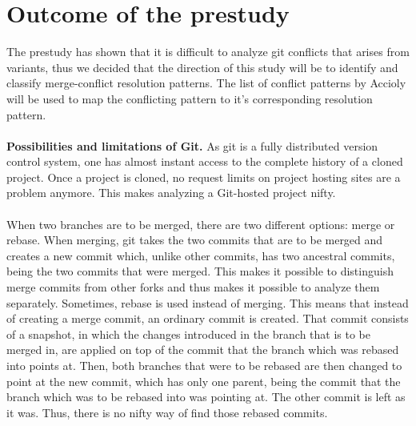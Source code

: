 \section{Outcome of the prestudy}
The prestudy has shown that it is difficult to analyze git conflicts that arises from variants, thus we decided that the direction of this study will be to identify and classify merge-conflict resolution patterns. The list of conflict patterns by Accioly will be used to map the conflicting pattern to it’s corresponding resolution pattern.
\paragraph*{}
\textbf{Possibilities and limitations of Git.} As git is a fully distributed version control system, one has almost instant access to the complete history of a cloned project. Once a project is cloned, no request limits on project hosting sites are a problem anymore. This makes analyzing a Git-hosted project nifty.
\paragraph*{}
When two branches are to be merged, there are two different options: merge or rebase. When merging, git takes the two commits that are to be merged and creates a new commit which, unlike other commits, has two ancestral commits, being the two commits that were merged. This makes it possible to distinguish merge commits from other forks and thus makes it possible to analyze them separately. Sometimes, rebase is used instead of merging. This means that instead of creating a merge commit, an ordinary commit is created. That commit consists of a snapshot, in which the changes introduced in the branch that is to be merged in, are applied on top of the commit that the branch which was rebased into points at. Then, both branches that were to be rebased are then changed to point at the new commit, which has only one parent, being the commit that the branch which was to be rebased into was pointing at. The other commit is left as it was. Thus, there is no nifty way of find those rebased commits.
